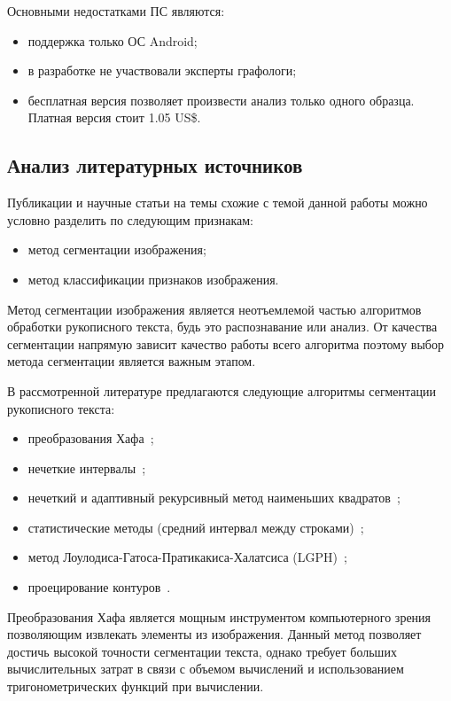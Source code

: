 Основными недостатками ПС являются:
\begin{itemize}
  \item поддержка только ОС Android;
  \item в разработке не участвовали эксперты графологи;
  \item бесплатная версия позволяет произвести анализ только одного образца. Платная версия стоит 1.05 US\$.
\end{itemize}

\subsection{Анализ литературных источников}
\label{sub:domain:literary_sources}

Публикации и научные статьи на темы схожие с темой данной работы можно условно разделить по следующим признакам:
\begin{itemize}
  \item метод сегментации изображения;
  \item метод классификации признаков изображения.
\end{itemize}

Метод сегментации изображения является неотъемлемой частью алгоритмов обработки рукописного текста, будь это распознавание или анализ. От качества сегментации напрямую зависит качество работы всего алгоритма поэтому выбор метода сегментации является важным этапом.

В рассмотренной литературе предлагаются следующие алгоритмы сегментации рукописного текста:
\begin{itemize}
  \item преобразования Хафа~\cite{louloudis_gatos_pratikakis_halatsis};
  \item нечеткие интервалы~\cite{louloudis_gatos_pratikakis_halatsis};
  \item нечеткий и адаптивный рекурсивный метод наименьших квадратов~\cite{louloudis_gatos_pratikakis_halatsis};
  \item статистические методы (средний интервал между строками)~\cite{gomathi_umadevi_mohanavel};
  \item метод Лоулодиса-Гатоса-Пратикакиса-Халатсиса (LGPH)~\cite{louloudis_gatos_pratikakis_halatsis};
  \item проецирование контуров~\cite{louloudis_gatos_pratikakis_halatsis}.
\end{itemize}

Преобразования Хафа является мощным инструментом компьютерного зрения позволяющим извлекать элементы из изображения. Данный метод позволяет достичь высокой точности сегментации текста, однако требует больших вычислительных затрат в связи с объемом вычислений и использованием тригонометрических функций при вычислении.

